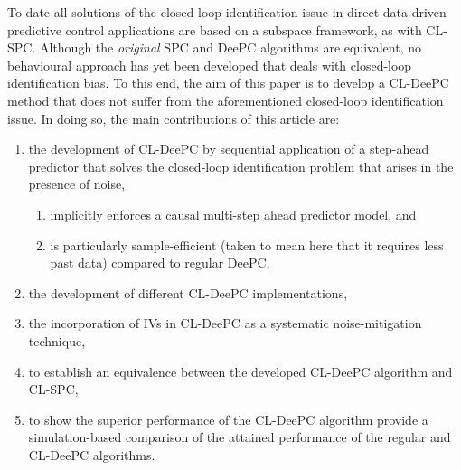 %
To date all solutions of the closed-loop identification issue in direct data-driven predictive control applications are based on a subspace framework, as with \ac{CL-SPC}. Although the \textit{original} \ac{SPC} and \ac{DeePC} algorithms are equivalent, no behavioural approach has yet been developed that deals with closed-loop identification bias.  To this end, the aim of this paper is to develop a \ac{CL-DeePC} method that does not suffer from the aforementioned closed-loop identification issue. In doing so, the main contributions of this article are: %
\begin{enumerate}%
\item the development of \ac{CL-DeePC} by sequential application of a step-ahead predictor that solves the closed-loop identification problem that arises in the presence of noise, \label{contribution:solves_CL_issue}
\begin{enumerate}
    \item implicitly enforces a causal multi-step ahead predictor model, and \label{contribution:causality}
    \item is particularly sample-efficient (taken to mean here that it requires less past data) compared to regular \ac{DeePC}, \label{contribution:sample_efficient}%
\end{enumerate}
\item the development of different \ac{CL-DeePC} implementations,
\item the incorporation of \ac{IVs} in \ac{CL-DeePC} as a systematic noise-mitigation technique,
\item to establish an equivalence between the developed \ac{CL-DeePC} algorithm and \ac{CL-SPC},
\item to show the superior performance of the \ac{CL-DeePC} algorithm provide a simulation-based comparison of the attained performance of the regular and \ac{CL-DeePC} algorithms.
\end{enumerate}